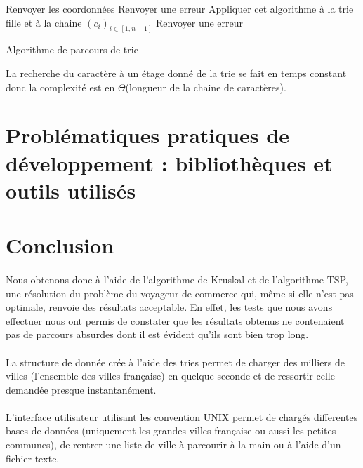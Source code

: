 \documentclass[a4paper]{article}
\begin{document}
\medskip

\begin{algorithm}[H]
  \SetAlgoLined
   {
     {
       {
        Renvoyer les coordonnées\;
      }{
        Renvoyer une erreur\;
      }
    }{
      Appliquer cet algorithme à la trie fille et à la chaine $(c_i)_{i \in [1,n-1]}$ \;
    }
  }{
    Renvoyer une erreur\;
  }
\caption{Algorithme de parcours de trie}
\end{algorithm}

\medskip

La recherche du caractère à un étage donné de la trie se fait en temps constant donc la complexité est en $\Theta$(longueur de la chaine de caractères).

\section{Problématiques pratiques de développement : bibliothèques et outils utilisés}


\section*{Conclusion}
\paragraph*{}
Nous obtenons donc à l'aide de l'algorithme de Kruskal et de l'algorithme TSP, une résolution du problème du voyageur de commerce qui, même si elle n'est pas optimale, renvoie des résultats acceptable. En effet, les tests que nous avons effectuer nous ont permis de constater que les résultats obtenus ne contenaient pas de parcours absurdes dont il est évident qu'ils sont bien trop long.
\paragraph*{}
La structure de donnée crée à l'aide des tries permet de charger des milliers de villes (l'ensemble des villes française) en quelque seconde et de ressortir celle demandée presque instantanément.
\paragraph*{}
L'interface utilisateur utilisant les convention UNIX permet de chargés differentes bases de données (uniquement les grandes villes française ou aussi les petites communes), de rentrer une liste de ville à parcourir à la main ou à l'aide d'un fichier texte.
\end{document}
